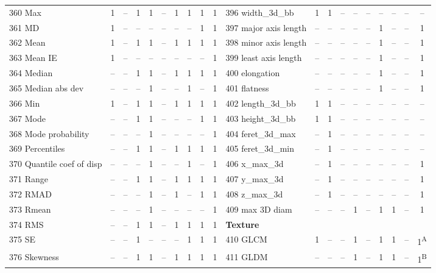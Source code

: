 \documentclass[sn-mathphys,Numbered]{sn-jnl}%
\theoremstyle{thmstyleone}%
\theoremstyle{thmstyletwo}%
\theoremstyle{thmstylethree}%
\begin{document}
\begin{table} [!hbt]
\begin{tiny}
\begin{tabular} {
  l  c  c  c  c  c  c  c  c  c   l  c  c  c  c  c  c  c  c  c
}
 360 Max & 1 & -- & 1 & 1 & -- & 1 & 1 & 1 & 1 & 396 width\_3d\_bb & 1 & 1 & -- & -- & -- & -- & -- & -- & -- \\
 361 MD & 1 & -- & -- & -- & -- & -- & -- & 1 & 1 & 397 major axis length & -- & -- & -- & -- & -- & 1 & -- & -- & 1 \\
 362 Mean & 1 & -- & 1 & 1 & -- & 1 & 1 & 1 & 1 & 398 minor axis length & -- & -- & -- & -- & -- & 1 & -- & -- & 1 \\
 363 Mean IE & 1 & -- & -- & -- & -- & -- & -- & -- & 1 & 399 least axis length & -- & -- & -- & -- & -- & 1 & -- & -- & 1 \\
 364 Median & -- & -- & 1 & 1 & -- & 1 & 1 & 1 & 1 & 400 elongation & -- & -- & -- & -- & -- & 1 & -- & -- & 1 \\
 365 Median abs dev & -- & -- & -- & 1 & -- & -- & 1 & -- & 1 & 401 flatness & -- & -- & -- & -- & -- & 1 & -- & -- & 1 \\
 366 Min & 1 & -- & 1 & 1 & -- & 1 & 1 & 1 & 1 & 402 length\_3d\_bb & 1 & 1 & -- & -- & -- & -- & -- & -- & -- \\
 367 Mode & -- & -- & 1 & 1 & -- & -- & -- & 1 & 1 & 403 height\_3d\_bb & 1 & 1 & -- & -- & -- & -- & -- & -- & -- \\
 368 Mode probability & -- & -- & -- & 1 & -- & -- & -- & -- & 1 & 404 feret\_3d\_max & -- & 1 & -- & -- & -- & -- & -- & -- & -- \\
 369 Percentiles & -- & -- & 1 & 1 & -- & 1 & 1 & 1 & 1 & 405 feret\_3d\_min & -- & 1 & -- & -- & -- & -- & -- & -- & -- \\
 370 Quantile coef of disp & -- & -- & -- & 1 & -- & -- & 1 & -- & 1 & 406 x\_max\_3d & -- & 1 & -- & -- & -- & -- & -- & -- & 1 \\
 371 Range & -- & -- & 1 & 1 & -- & 1 & 1 & 1 & 1 & 407 y\_max\_3d & -- & 1 & -- & -- & -- & -- & -- & -- & 1 \\
 372 RMAD & -- & -- &  -- &  1 & -- & 1 &  -- & 1 & 1 & 408 z\_max\_3d & -- & 1 & -- & -- & -- & -- & -- & -- & 1 \\
 373 Rmean & -- & -- & -- & 1 & -- & -- & -- & -- & 1 & 409 max 3D diam & -- & -- & -- & 1 & -- & 1 & 1 & -- & 1 \\
 374 RMS & -- & -- & 1 & 1 & -- & 1 & 1 & 1 & 1 &  \bf Texture \rm &  &  &  &  &  &  &  &  &  \\
 375 SE & -- & -- & 1 & -- & -- & -- & 1 & 1 & 1 & 410 GLCM & 1 & -- & -- & 1 & -- & 1 & 1 & -- & 1\textsuperscript{A} \\
 376 Skewness & -- & -- & 1 & 1 & -- & 1 & 1 & 1 & 1 & 411 GLDM & -- & -- & -- & 1 & -- & 1 & 1 & -- & 1\textsuperscript{B} \\

\end{tabular}
\end{tiny}
\end{table}
\end{document}
